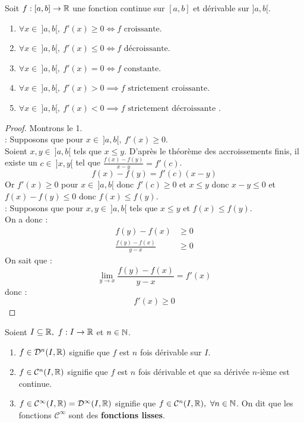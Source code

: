\begin{proposition}
    Soit $f : [a, b] \to \mathbb{R}$ une fonction continue sur $[a, b]$ et dérivable sur $]a, b[$.
    \begin{enumerate}
            \item $\forall x \in \ ]a, b[,\ f'(x) \geq 0 \iff f \text{ croissante}$.
            \item $\forall x \in \ ]a, b[,\ f'(x) \leq 0 \iff f \text{ décroissante}$.
            \item $\forall x \in \ ]a, b[,\ f'(x) = 0 \iff f \text{ constante}$.
            \item $\forall x \in \ ]a, b[,\ f'(x) > 0 \implies f \text{ strictement croissante}$.
            \item $\forall x \in \ ]a, b[,\ f'(x) < 0 \implies f \text{ strictement décroissante}$ .
        \end{enumerate}
\end{proposition}

\begin{proof}
	Montrons le 1. 
	\\
	\boxed{\implies} : Supposons que pour $x \in \ ]a, b[,\ f'(x) \geq 0$. \\
	Soient $x, y \in \ ]a, b[$ tels que $x \leq y$. D'après le théorème des accroissements finis, il existe un $c \in \ ]x, y[$ tel que $\frac{f(x) - f(y)}{x - y} = f'(c)$.
	\[ f(x) - f(y) = f'(c)(x - y) \]
	Or $f'(x) \geq 0$ pour $x \in \ ]a, b[$ donc $f'(c) \geq 0$ et $x \leq y$ donc $x - y \leq 0$ et $f(x) - f(y) \leq 0$ donc  $f(x) \leq f(y)$.
	\\
	\boxed{\impliedby} : Supposons que pour $x, y \in \ ]a, b[$ tels que $x \leq y$ et $f(x) \leq f(y)$. \\
	On a donc :
	\begin{align*}
		f(y) - f(x) &\geq 0 \\
		\frac{f(y) - f(x)}{y - x} &\geq 0 
	\end{align*}
	On sait que :
	\[ \lim_{y \to x} \frac{f(y) - f(x)}{y - x} = f'(x) \]
	donc :
	\[ f'(x) \geq 0 \]
\end{proof}

\begin{definition}
	Soient $I \subseteq \mathbb{R},\ f : I \to \mathbb{R}$ et $n \in \mathbb{N}$.
	\begin{enumerate}
		\item $f \in \mathcal{D}^n(I, \mathbb{R})$ signifie que $f$ est $n$ fois dérivable sur $I$.
		\item $f \in \mathcal{C}^n(I, \mathbb{R})$ signifie que $f$ est $n$ fois dérivable et que sa dérivée $n$-ième est continue.
		\item $f \in \mathcal{C}^{\infty}(I, \mathbb{R}) = \mathcal{D}^{\infty}(I, \mathbb{R})$ signifie que $f \in \mathcal{C}^n(I, \mathbb{R}),\ \forall n \in \mathbb{N}$. On dit que les fonctions $\mathcal{C}^{\infty}$ sont des \textbf{fonctions lisses}.
	\end{enumerate}
\end{definition}

